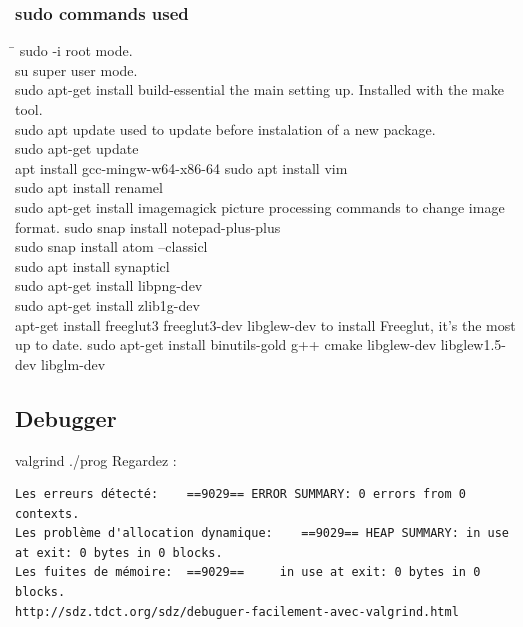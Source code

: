 \documentclass[12pt]{article}
\begin{document}
\subsubsection{sudo commands used}
\begin{tabbing}
\hspace{10cm}\=\kill
sudo -i \> root mode.\\
su \> super user mode.\\
sudo apt-get install build-essential \> the main setting up. Installed with the make tool.\\
sudo apt update \> used to update before instalation of a new package.\\
sudo apt-get update \\
apt install gcc-mingw-w64-x86-64 \> 
sudo apt install vim\\ 
sudo apt install renamel \> \\
sudo apt-get install imagemagick\cite{IM7_commands} \> picture processing commands to change image format\cite{IM7}.
sudo snap install notepad-plus-plus\\
sudo snap install atom --classicl \> \\
sudo apt install synapticl \> \\
sudo apt-get install libpng-dev \> \\ 
sudo apt-get install zlib1g-dev \> \\

apt-get install freeglut3 freeglut3-dev libglew-dev \> to install Freeglut, it's the most up to date.
sudo apt-get install binutils-gold g++ cmake libglew-dev libglew1.5-dev libglm-dev\\
\end{tabbing}


\subsection{Debugger}
valgrind ./prog
Regardez :
\begin{lstlisting}
Les erreurs détecté:	==9029== ERROR SUMMARY: 0 errors from 0 contexts.
Les problème d'allocation dynamique: 	==9029== HEAP SUMMARY: in use at exit: 0 bytes in 0 blocks.
Les fuites de mémoire: 	==9029==     in use at exit: 0 bytes in 0 blocks.
http://sdz.tdct.org/sdz/debuguer-facilement-avec-valgrind.html
\end{lstlisting}
\end{document}
